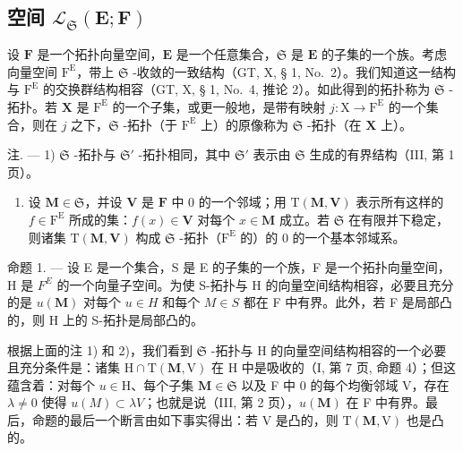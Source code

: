 \subsection{\texorpdfstring{空间 \(\mathcal{L}_{\mathfrak{S}}(\mathbf{E};\mathbf{F})\)}{空间 \textbackslash mathcal\{L\}\_\{\textbackslash mathfrak\{S\}\}(\textbackslash mathbf\{E\};\textbackslash mathbf\{F\})}}

设 \(\mathbf{F}\) 是一个拓扑向量空间，\(\mathbf{E}\) 是一个任意集合，\(\mathfrak{S}\) 是 \(\mathbf{E}\) 的子集的一个族。考虑向量空间 \(\mathrm{F}^{\mathrm{E}}\)，带上 \(\mathfrak{S}\) -收敛的一致结构（GT, X, § 1, No.~2）。我们知道这一结构与 \(\mathrm{F}^{\mathrm{E}}\) 的交换群结构相容（GT, X, § 1, No.~4, 推论 2）。如此得到的拓扑称为 \(\mathfrak{S}\) -拓扑。若 \(\mathbf{X}\) 是 \(\mathrm{F}^{\mathrm{E}}\) 的一个子集，或更一般地，是带有映射 \(j: \mathrm{X} \to \mathrm{F}^{\mathrm{E}}\) 的一个集合，则在 \(j\) 之下，\(\mathfrak{S}\) -拓扑（于 \(\mathrm{F}^{\mathrm{E}}\) 上）的原像称为 \(\mathfrak{S}\) -拓扑（在 \(\mathbf{X}\) 上）。

注. --- 1) \(\mathfrak{S}\) -拓扑与 \(\mathfrak{S}'\) -拓扑相同，其中 \(\mathfrak{S}'\) 表示由 \(\mathfrak{S}\) 生成的有界结构（III, 第 1 页）。

\begin{enumerate}
\def\labelenumi{\arabic{enumi})}
\setcounter{enumi}{1}
\tightlist
\item
  设 \(\mathbf{M} \in \mathfrak{S}\)，并设 \(\mathbf{V}\) 是 \(\mathbf{F}\) 中 0 的一个邻域；用 \(\mathrm{T}(\mathbf{M}, \mathbf{V})\) 表示所有这样的 \(f \in \mathrm{F}^{\mathrm{E}}\) 所成的集：\(f(x) \in \mathbf{V}\) 对每个 \(x \in \mathbf{M}\) 成立。若 \(\mathfrak{S}\) 在有限并下稳定，则诸集 \(\mathrm{T}(\mathbf{M}, \mathbf{V})\) 构成 \(\mathfrak{S}\) -拓扑（\(\mathrm{F}^{\mathrm{E}}\) 的）的 0 的一个基本邻域系。
\end{enumerate}

命题 1. --- 设 E 是一个集合，S 是 E 的子集的一个族，F 是一个拓扑向量空间，H 是 \(F^{E}\) 的一个向量子空间。为使 S-拓扑与 H 的向量空间结构相容，必要且充分的是 \(u(\mathbf{M})\) 对每个 \(u \in H\) 和每个 \(M \in S\) 都在 F 中有界。此外，若 F 是局部凸的，则 H 上的 S-拓扑是局部凸的。

根据上面的注 1) 和 2)，我们看到 \(\mathfrak{S}\) -拓扑与 H 的向量空间结构相容的一个必要且充分条件是：诸集 \(\mathrm{H} \cap \mathrm{T}(\mathbf{M}, \mathrm{V})\) 在 H 中是吸收的（I, 第 7 页, 命题 4）；但这蕴含着：对每个 \(u \in \mathrm{H}\)、每个子集 \(\mathbf{M} \in \mathfrak{S}\) 以及 F 中 0 的每个均衡邻域 V，存在 \(\lambda \neq 0\) 使得 \(u(M) \subset \lambda V\)；也就是说（III, 第 2 页），\(u(\mathbf{M})\) 在 F 中有界。最后，命题的最后一个断言由如下事实得出：若 V 是凸的，则 \(\mathrm{T}(\mathbf{M}, \mathrm{V})\) 也是凸的。

